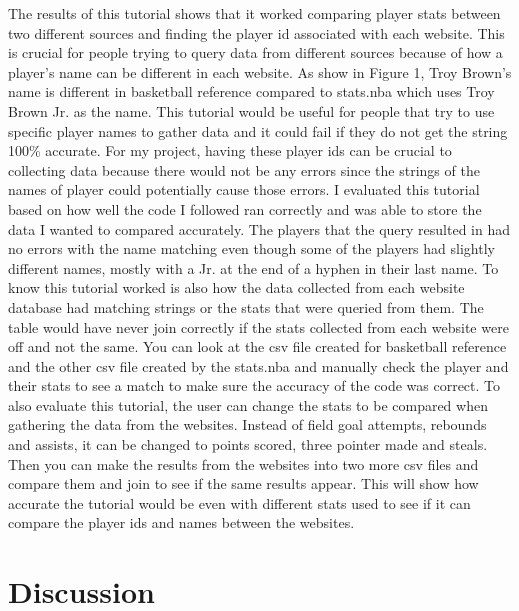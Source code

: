 \documentclass[10pt,twocolumn]{article}
\begin{document}
The results of this tutorial shows that it worked comparing player stats between two different sources and finding the player id associated with each website. This is crucial for people trying to query data from different sources because of how a player's name can be different in each website. As show in Figure 1, Troy Brown's name is different in basketball reference compared to stats.nba which uses Troy Brown Jr. as the name. This tutorial would be useful for people that try to use specific player names to gather data and it could fail if they do not get the string 100\% accurate. For my project, having these player ids can be crucial to collecting data because there would not be any errors since the strings of the names of player could potentially cause those errors. I evaluated this tutorial based on how well the code I followed ran correctly and was able to store the data I wanted to compared accurately. The players that the query resulted in had no errors with the name matching even though some of the players had slightly different names, mostly with a Jr. at the end of a hyphen in their last name. To know this tutorial worked is also how the data collected from each website database had matching strings or the stats that were queried from them. The table would have never join correctly if the stats collected from each website were off and not the same. You can look at the csv file created for basketball reference and the other csv file created by the stats.nba and manually check the player and their stats to see a match to make sure the accuracy of the code was correct. To also evaluate this tutorial, the user can change the stats to be compared when gathering the data from the websites. Instead of field goal attempts, rebounds and assists, it can be changed to points scored, three pointer made and steals. Then you can make the results from the websites into two more csv files and compare them and join to see if the same results appear. This will show how accurate the tutorial would be even with different stats used to see if it can compare the player ids and names between the websites. 

\section{Discussion}
\end{document}
